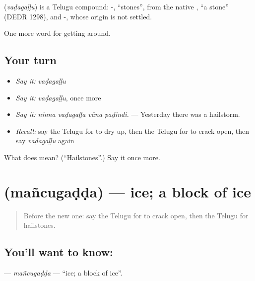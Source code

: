 \begin{cousinweb}
\textbf{} (\emph{vaḍagaḷḷu}) is a Telugu compound: -, \textquotedblleft{}stones\textquotedblright{}, from the native , \textquotedblleft{}a stone\textquotedblright{} (DEDR 1298), and -, whose origin is not settled.
\end{cousinweb}

\begin{grammarlens}[title={What you've built}]
One more word for getting around.
\end{grammarlens}

\subsection*{Your turn}
\begin{itemize}
\raggedright
  \item \emph{Say it:} \emph{vaḍagaḷḷu}
  \item \emph{Say it:} \emph{vaḍagaḷḷu}, once more
  \item \emph{Say it:} \emph{ninna vaḍagaḷḷa vāna paḍindi.} — Yesterday there was a hailstorm.
  \item \emph{Recall:} say the Telugu for to dry up, then the Telugu for to crack open, then say \emph{vaḍagaḷḷu} again
\end{itemize}

\begin{tcolorbox}[breakable,colback=teal!4,colframe=teal!35!black,title={Before you move on}]
What does  mean? (\textquotedblleft{}Hailstones\textquotedblright{}.) Say it once more.
\end{tcolorbox}
\section[\texorpdfstring{\te{మంచుగడ్డ} (mañcugaḍḍa)}{మంచుగడ్డ (mañcugaḍḍa)}]{ (mañcugaḍḍa) — ice; a block of ice}

\label{lesson:TE-C482-mancugadda}



\begin{quote}
Before the new one: say the Telugu for to crack open, then the Telugu for hailstones.
\end{quote}

\subsection*{You'll want to know: }
\textbf{} — \emph{mañcugaḍḍa} — \textquotedblleft{}ice; a block of ice\textquotedblright{}.

